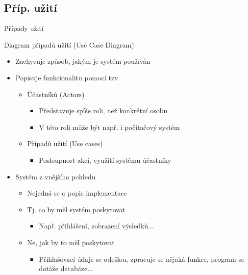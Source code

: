 \subsection{Příp. užití}



\begin{frame}{Případy užití}

Diagram případů užití (Use Case Diagram)

\begin{itemize}
	\item Zachycuje způsob, jakým je systém používán
	\item Popisuje funkcionalitu pomocí tzv.
	\begin{itemize}
		\item Účastníků (Actors)
		\begin{itemize}
			\item Představuje spíše roli, než konkrétní osobu
			\item V této roli může být např. i počítačový systém
		\end{itemize}
		\item Případů užití (Use cases)
		\begin{itemize}
			\item Posloupnost akcí, využití systému účastníky
		\end{itemize}
	\end{itemize}
	\item Systém z vnějšího pohledu
	\begin{itemize}
		\item Nejedná se o popis implementace
		\item Tj. co by měl systém poskytovat
		\begin{itemize}
			\item Např. přihlášení, zobrazení výsledků...
		\end{itemize}
		\item Ne, jak by to měl poskytovat
		\begin{itemize}
			\item Přihlašovací údaje se odešlou, zpracuje se nějaká funkce,
			program se dotáže databáze...
		\end{itemize}
	\end{itemize}
\end{itemize}


\end{frame}


